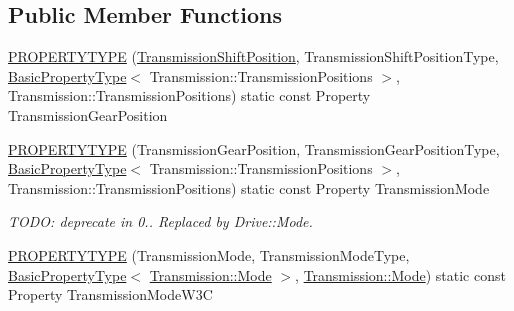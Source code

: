 \subsection*{Public Member Functions}
\begin{DoxyCompactItemize}
\item 
\hyperlink{classVehicleProperty_a768a0be8079ce3e1645cdc259a84adf7}{P\+R\+O\+P\+E\+R\+T\+Y\+T\+Y\+P\+E} (\hyperlink{classVehicleProperty_ae486d9ea26918460822086b797018800}{Transmission\+Shift\+Position}, Transmission\+Shift\+Position\+Type, \hyperlink{classBasicPropertyType}{Basic\+Property\+Type}$<$ Transmission\+::\+Transmission\+Positions $>$, Transmission\+::\+Transmission\+Positions) static const Property Transmission\+Gear\+Position
\item 
\hypertarget{classVehicleProperty_af9df28b1bc1bef05442b6b1cce40c80e}{\hyperlink{classVehicleProperty_af9df28b1bc1bef05442b6b1cce40c80e}{P\+R\+O\+P\+E\+R\+T\+Y\+T\+Y\+P\+E} (Transmission\+Gear\+Position, Transmission\+Gear\+Position\+Type, \hyperlink{classBasicPropertyType}{Basic\+Property\+Type}$<$ Transmission\+::\+Transmission\+Positions $>$, Transmission\+::\+Transmission\+Positions) static const Property Transmission\+Mode}\label{classVehicleProperty_af9df28b1bc1bef05442b6b1cce40c80e}

\begin{DoxyCompactList}\small\item\em T\+O\+D\+O\+: deprecate in 0.. Replaced by Drive\+::\+Mode. \end{DoxyCompactList}\item 
\hyperlink{classVehicleProperty_ab54cbac952e0414507dfd9afa8e11b13}{P\+R\+O\+P\+E\+R\+T\+Y\+T\+Y\+P\+E} (Transmission\+Mode, Transmission\+Mode\+Type, \hyperlink{classBasicPropertyType}{Basic\+Property\+Type}$<$ \hyperlink{interfaceTransmission_a15d0278c6e0dc75cd28f5aeaadb86680}{Transmission\+::\+Mode} $>$, \hyperlink{interfaceTransmission_a15d0278c6e0dc75cd28f5aeaadb86680}{Transmission\+::\+Mode}) static const Property Transmission\+Mode\+W3\+C
\end{DoxyCompactItemize}
